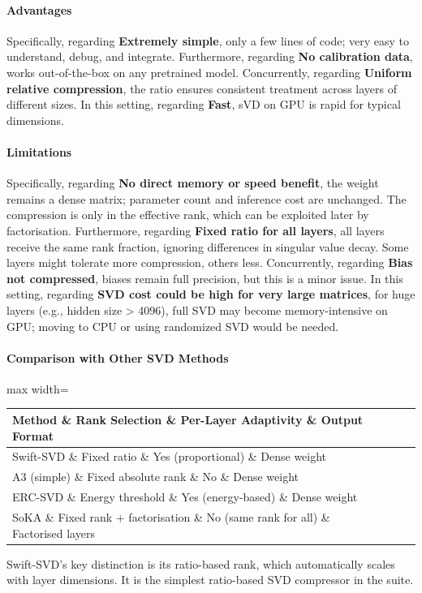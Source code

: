 \paragraph{Advantages}

Specifically, regarding \textbf{Extremely simple}, only a few lines of code; very easy to understand, debug, and integrate. Furthermore, regarding \textbf{No calibration data}, works out-of-the-box on any pretrained model. Concurrently, regarding \textbf{Uniform relative compression}, the ratio ensures consistent treatment across layers of different sizes. In this setting, regarding \textbf{Fast}, sVD on GPU is rapid for typical dimensions.


\paragraph{Limitations}

Specifically, regarding \textbf{No direct memory or speed benefit}, the weight remains a dense matrix; parameter count and inference cost are unchanged. The compression is only in the effective rank, which can be exploited later by factorisation. Furthermore, regarding \textbf{Fixed ratio for all layers}, all layers receive the same rank fraction, ignoring differences in singular value decay. Some layers might tolerate more compression, others less. Concurrently, regarding \textbf{Bias not compressed}, biases remain full precision, but this is a minor issue. In this setting, regarding \textbf{SVD cost could be high for very large matrices}, for huge layers (e.g., hidden size > 4096), full SVD may become memory-intensive on GPU; moving to CPU or using randomized SVD would be needed.


\paragraph{Comparison with Other SVD Methods}

\begin{center}
\begin{adjustbox}{max width=\columnwidth}
\renewcommand{\arraystretch}{1.2}
\begin{tabular}{llll}
\toprule
Method \& Rank Selection \& Per-Layer Adaptivity \& Output Format \\
\midrule
Swift-SVD \& Fixed ratio \& Yes (proportional) \& Dense weight \\
A3 (simple) \& Fixed absolute rank \& No \& Dense weight \\
ERC-SVD \& Energy threshold \& Yes (energy-based) \& Dense weight \\
SoKA \& Fixed rank + factorisation \& No (same rank for all) \& Factorised layers \\

\bottomrule
\end{tabular}
\end{adjustbox}
\end{center}
Swift-SVD's key distinction is its ratio-based rank, which automatically scales with layer dimensions. It is the simplest ratio-based SVD compressor in the suite.


